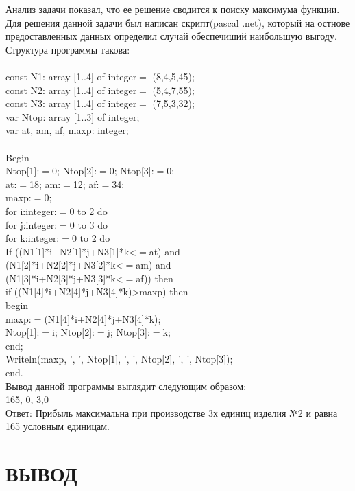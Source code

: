 \documentclass[russian,utf8,nocolumnxxxi,nocolumnxxxii]{eskdtext}
\begin{document}
Анализ задачи показал, что ее решение сводится к поиску максимума функции. Для решения данной задачи был написан скрипт(pascal .net), который на остнове предоставленных данных определил случай обеспечиший наибольшую выгоду.
Структура программы такова:\\
\\
 const N1: array [1..4] of integer$=$ (8,4,5,45);\\
const N2: array [1..4] of integer$=$ (5,4,7,55);\\
const N3: array [1..4] of integer$=$ (7,5,3,32);\\
var Ntop: array [1..3] of integer;\\
var at, am, af, maxp: integer; \\
\\
Begin\\
    Ntop[1]:$=$0; Ntop[2]:$=$0; Ntop[3]:$=$0;\\
    at:$=$18; am:$=$12; af:$=$34;\\
    maxp:$=$0;\\
    for i:integer:$=$0 to 2 do\\
       for j:integer:$=$0 to 3 do\\ 
           for k:integer:$=$0 to 2 do\\
             If ((N1[1]*i+N2[1]*j+N3[1]*k<$=$at) and\\ (N1[2]*i+N2[2]*j+N3[2]*k<$=$am) and\\ (N1[3]*i+N2[3]*j+N3[3]*k<$=$af)) then\\
                 if ((N1[4]*i+N2[4]*j+N3[4]*k)>maxp) then\\ 
                       begin\\
                         maxp:$=$(N1[4]*i+N2[4]*j+N3[4]*k);\\
                         Ntop[1]:$=$i; Ntop[2]:$=$j; Ntop[3]:$=$k;\\
                       end;\\
    Writeln(maxp, ', ', Ntop[1], ', ', Ntop[2], ', ', Ntop[3]);\\
end.\\

Вывод данной программы выглядит следующим образом:\\ 165, 0, 3,0\\

Ответ: Прибыль максимальна при производстве 3х единиц изделия №2 и равна 165 условным единицам.

\newpage
\section{ВЫВОД}
\end{document}
